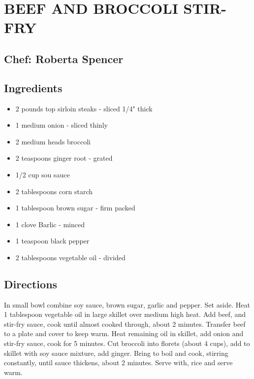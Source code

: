 \documentclass[
]{book}
\providecommand{\tightlist}{%
  \setlength{\itemsep}{0pt}\setlength{\parskip}{0pt}}
\begin{document}
\hypertarget{beef-and-broccoli-stir-fry}{%
\section*{BEEF AND BROCCOLI STIR-FRY}\label{beef-and-broccoli-stir-fry}}


\hypertarget{chef-roberta-spencer-16}{%
\subsection*{Chef: Roberta Spencer}\label{chef-roberta-spencer-16}}


\hypertarget{ingredients-44}{%
\subsection*{Ingredients}\label{ingredients-44}}


\begin{itemize}
\tightlist
\item
  2 pounds top sirloin steaks - sliced 1/4" thick
\item
  1 medium onion - sliced thinly
\item
  2 medium heads broccoli
\item
  2 teaspoons ginger root - grated
\item
  1/2 cup sou sauce
\item
  2 tablespoons corn starch
\item
  1 tablespoon brown sugar - firm packed
\item
  1 clove Barlic - minced
\item
  1 teaspoon black pepper
\item
  2 tablespoons vegetable oil - divided
\end{itemize}

\hypertarget{directions-44}{%
\subsection*{Directions}\label{directions-44}}


In small bowl combine soy sauce, brown sugar, garlic and pepper.
Set aside. Heat 1 tablespoon vegetable oil in large skillet over
medium high heat. Add beef, and stir-fry sauce, cook until almost
cooked through, about 2 minutes. Transfer beef to a plate and cover
to keep warm. Heat remaining oil in skillet, add onion and stir-fry sauce,
cook for 5 minutes. Cut broccoli into florets (about 4 cups), add to
skillet with soy sauce mixture, add ginger. Bring to boil and cook,
stirring constantly, until sauce thickens, about 2 minutes. Serve with,
rice and serve warm.
\end{document}
